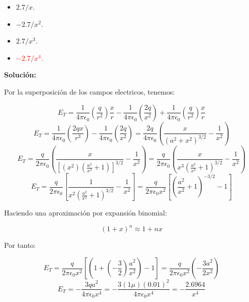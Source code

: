 \documentclass[letter,11pt]{article}
\begin{document}
\begin{enumerate}
\begin{itemize}
    \item $ 2.7/x$.
    \item $-2.7/x^2$.
    \item $ 2.7/x^3$.
    \item \textcolor{red}{$-2.7/x^4$.}
\end{itemize}

\textbf{Solución:}

Por la superposición de los campos electricos, tenemos:

\begin{equation*}
    E_T = \frac{1}{4\pi\epsilon_0}\left(\frac{q}{r^2}\right)\frac{x}{r}
        - \frac{1}{4\pi\epsilon_0}\left(\frac{2q}{x^2}\right)
        + \frac{1}{4\pi\epsilon_0}\left(\frac{q}{r^2}\right)\frac{x}{r}
\end{equation*}
\begin{equation*}
    E_T = \frac{1}{4\pi\epsilon_0}\left(\frac{2qx}{r^3}\right)
        - \frac{1}{4\pi\epsilon_0}\left(\frac{2q}{x^2}\right)
        = \frac{2q}{4\pi\epsilon_0}\left(
          \frac{x}{(a^2+x^2)^{3/2}}-\frac{1}{x^2}\right)
\end{equation*}
\begin{equation*}
    E_T = \frac{q}{2\pi\epsilon_0}\left(
          \frac{x}{[(x^2)(\frac{a^2}{x^2}+1)]^{3/2}}-\frac{1}{x^2}\right)
        = \frac{q}{2\pi\epsilon_0}\left(
          \frac{x}{x^3(\frac{a^2}{x^2}+1)^{3/2}}-\frac{1}{x^2}\right)
\end{equation*}
\begin{equation*}
    E_T = \frac{q}{2\pi\epsilon_0}\left[
          \frac{1}{x^2\left(\frac{a^2}{x^2}+1\right)^{3/2}}-\frac{1}{x^2}\right]
        = \frac{q}{2\pi\epsilon_0 x^2}\left[
          \left(\frac{a^2}{x^2}+1\right)^{-3/2}-1\right]
\end{equation*}

Haciendo una aproximación por expansión binomial:

\begin{equation*}
    (1 + x)^n \approx 1 + nx
\end{equation*}

Por tanto:

\begin{equation*}
    E_T = \frac{q}{2\pi\epsilon_0 x^2}\left[
          \left(1+\left(-\frac{3}{2}\right)\frac{a^2}{x^2}\right)-1\right]
        = \frac{q}{2\pi\epsilon_0 x^2}\left(-\frac{3a^2}{2x^2}\right)
\end{equation*}
\begin{equation*}
    E_T = -\frac{3qa^2}{4\pi\epsilon_0 x^4}
        = -\frac{3(1\mu)(0.01)^2}{4\pi\epsilon_0 x^4}
        = -\frac{2.6964}{x^4}
\end{equation*}


\end{enumerate}
\end{document}
